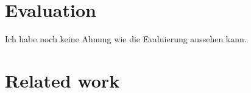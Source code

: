 \documentclass{article}
\begin{document}
\section{Evaluation}
Ich habe noch keine Ahnung wie die Evaluierung aussehen kann.

\section{Related work}

\end{document}
